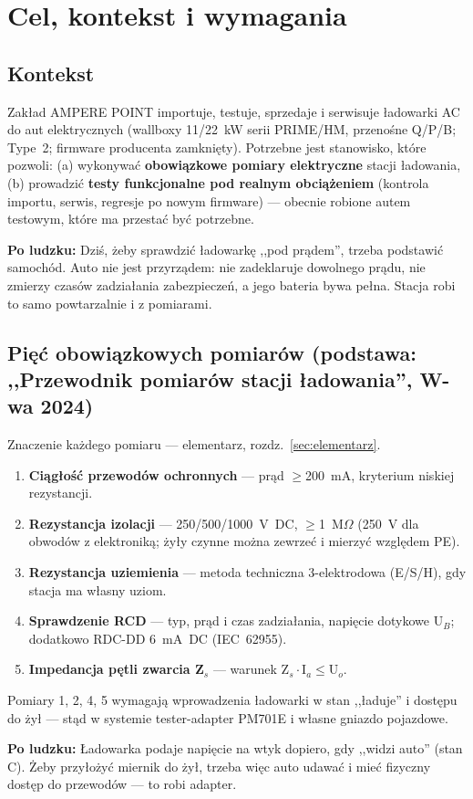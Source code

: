 \documentclass[11pt,a4paper]{article}
\newcommand{\ohm}{$\Omega$}
\newcommand{\why}[1]{\par\smallskip\noindent\colorbox{blue!6}{\parbox{0.965\linewidth}{\small\textbf{Po ludzku:} #1}}\par\smallskip}
\begin{document}
\section{Cel, kontekst i wymagania}
\subsection{Kontekst}
Zakład AMPERE POINT importuje, testuje, sprzedaje i serwisuje ładowarki AC do aut elektrycznych
(wallboxy 11/22~kW serii PRIME/HM, przenośne Q/P/B; Type~2; firmware producenta zamknięty).
Potrzebne jest stanowisko, które pozwoli: (a) wykonywać \textbf{obowiązkowe pomiary elektryczne}
stacji ładowania, (b) prowadzić \textbf{testy funkcjonalne pod realnym obciążeniem} (kontrola
importu, serwis, regresje po nowym firmware) --- obecnie robione autem testowym, które ma przestać
być potrzebne.
\why{Dziś, żeby sprawdzić ładowarkę ,,pod prądem'', trzeba podstawić samochód. Auto nie jest
przyrządem: nie zadeklaruje dowolnego prądu, nie zmierzy czasów zadziałania zabezpieczeń, a jego
bateria bywa pełna. Stacja robi to samo powtarzalnie i z pomiarami.}
\subsection{Pięć obowiązkowych pomiarów (podstawa: ,,Przewodnik pomiarów stacji ładowania'', W-wa 2024)}
Znaczenie każdego pomiaru --- elementarz, rozdz.~\ref{sec:elementarz}.
\begin{enumerate}
\item \textbf{Ciągłość przewodów ochronnych} --- prąd $\ge$200~mA, kryterium niskiej rezystancji.
\item \textbf{Rezystancja izolacji} --- 250/500/1000~V~DC, $\ge$1~M\ohm{} (250~V dla obwodów
z elektroniką; żyły czynne można zewrzeć i mierzyć względem PE).
\item \textbf{Rezystancja uziemienia} --- metoda techniczna 3-elektrodowa (E/S/H), gdy stacja ma
własny uziom.
\item \textbf{Sprawdzenie RCD} --- typ, prąd i czas zadziałania, napięcie dotykowe U$_B$;
dodatkowo RDC-DD 6~mA~DC (IEC~62955).
\item \textbf{Impedancja pętli zwarcia Z$_s$} --- warunek Z$_s\cdot$I$_a\le$U$_o$.
\end{enumerate}
Pomiary 1, 2, 4, 5 wymagają wprowadzenia ładowarki w stan ,,ładuje'' i dostępu do żył --- stąd
w systemie tester-adapter PM701E i własne gniazdo pojazdowe.
\why{Ładowarka podaje napięcie na wtyk dopiero, gdy ,,widzi auto'' (stan C). Żeby przyłożyć
miernik do żył, trzeba więc auto udawać i mieć fizyczny dostęp do przewodów --- to robi adapter.}
\end{document}
